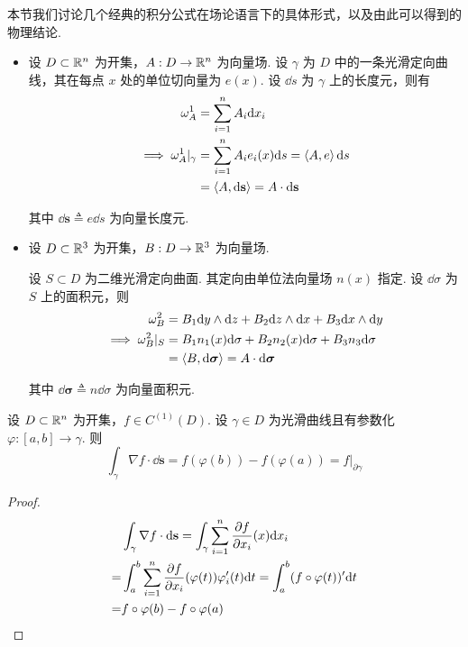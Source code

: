 本节我们讨论几个经典的积分公式在场论语言下的具体形式，以及由此可以得到的物理结论.



\begin{itemize}
    \item 设 $D\subset\mathbb{R}^n$ 为开集，$A:D\to\mathbb{R}^n$ 为向量场. 设 $\gamma$ 为 $D$ 中的一条光滑定向曲线，其在每点 $x$ 处的单位切向量为 $e(x)$. 设 $\dd s$ 为 $\gamma$ 上的长度元，则有
$$
\begin{aligned}
    \omega_A^1&=\sum_{i=1}^nA_i\mathrm{d} x_i\\
    \implies\omega_A^1|_\gamma&=\sum_{i=1}^nA_ie_i(x)\mathrm{d} s=\left\langle{A,e}\right\rangle\mathrm{d} s\\
    &=\left\langle{A,\mathrm{d}\mathbf{s}}\right\rangle=A\cdot\mathrm{d}\mathbf{s}
\end{aligned}
$$
    
    其中 $\dd\mathbf{s}\triangleq e\dd s$ 为向量长度元.

    \item 设 $D\subset\mathbb{R}^3$ 为开集，$B:D\to\mathbb{R}^3$ 为向量场.
    
    设 $S\subset D$ 为二维光滑定向曲面. 其定向由单位法向量场 $n(x)$ 指定. 设 $\dd\sigma$ 为 $S$ 上的面积元，则
$$
\begin{aligned}
    \omega_B^2&=B_1\mathrm{d} y\wedge\mathrm{d} z+B_2\mathrm{d} z\wedge\mathrm{d} x+B_3\mathrm{d} x\wedge\mathrm{d} y\\
    \implies\omega_B^2|_S&=B_1n_1(x)\mathrm{d}\sigma+B_2n_2(x)\mathrm{d}\sigma+B_3n_3\mathrm{d}\sigma\\
    &=\left\langle{B,\mathrm{d}\bm{\sigma}}\right\rangle=A\cdot\mathrm{d}\bm{\sigma}
\end{aligned}
$$

    其中 $\dd\bm{\sigma}\triangleq n\dd\sigma$ 为向量面积元.
\end{itemize}


\begin{theorem}  
    设 $D\subset\mathbb{R}^n$ 为开集，$f\in C^{(1)}(D)$. 设 $\gamma\in D$ 为光滑曲线且有参数化 $\varphi:[a,b]\to\gamma$. 则
$$
\int_\gamma\nabla f\cdot\dd\mathbf{s}=f(\varphi(b))-f(\varphi(a))=f|_{\partial\gamma}
$$
\end{theorem}
\begin{proof}
$$
\begin{aligned}
    &\int_\gamma\nabla f\cdot\mathrm{d}\mathbf{s}=\int_\gamma\sum_{i=1}^n\frac{\partial{f}}{\partial{x_i}}(x)\mathrm{d} x_i\\
    =&\int_a^b\sum_{i=1}^n\frac{\partial{f}}{\partial{x_i}}(\varphi(t))\varphi_i'(t)\mathrm{d} t=\int_a^b(f\circ\varphi(t))'\mathrm{d} t\\
    =&f\circ\varphi(b)-f\circ\varphi(a)
\end{aligned}
$$
\end{proof}

